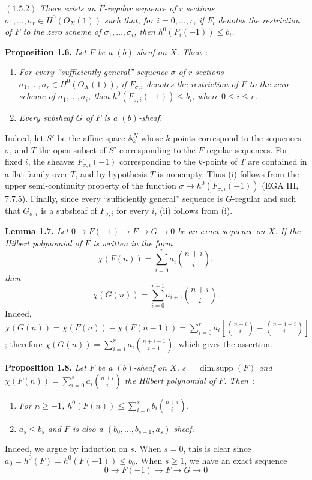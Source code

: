 \((1.5.2)\) \emph{There exists an \(F\)-regular sequence of \(r\) sections \(\sigma_1,\ldots,\sigma_r\in H^0({O}_X(1))\) such that, for \(i=0,\ldots,r\), if \(F_i\) denotes the restriction of \(F\) to the zero scheme of \(\sigma_1,\ldots,\sigma_i\), then \(h^0(F_i(-1))\le b_i\).}

\textbf{Proposition 1.6.} \emph{Let \(F\) be a \((b)\)-sheaf on \(X\). Then}~:
\begin{enumerate}[label=(\roman*)]
\item \emph{For every ``sufficiently general'' sequence \(\sigma\) of \(r\) sections \(\sigma_1,\ldots,\sigma_r\in H^0({O}_X(1))\), if \(F_{\sigma,i}\) denotes the restriction of \(F\) to the zero scheme of \(\sigma_1,\ldots,\sigma_i\), then \(h^0(F_{\sigma,i}(-1))\le b_i\), where \(0\le i\le r\).}
\item \emph{Every subsheaf \(G\) of \(F\) is a \((b)\)-sheaf.}
\end{enumerate}

%
Indeed, let \(S'\) be the affine space \(\mathbb A_k^N\) whose \(k\)-points correspond to the sequences \(\sigma\), and \(T\) the open subset of \(S'\) corresponding to the \(F\)-regular sequences. For fixed \(i\), the sheaves \(F_{\sigma,i}(-1)\) corresponding to the \(k\)-points of \(T\) are contained in a flat family over \(T\), and by hypothesis \(T\) is nonempty. Thus (i) follows from the upper semi-continuity property of the function $\sigma\longmapsto h^0(F_{\sigma,i}(-1))$ (EGA III, 7.7.5). Finally, since every ``sufficiently general'' sequence is \(G\)-regular and such that \(G_{\sigma,i}\) is a subsheaf of \(F_{\sigma,i}\) for every \(i\), (ii) follows from (i).

\textbf{Lemma 1.7.} \emph{Let \(0\to F(-1)\to F\to G\to0\) be an exact sequence on \(X\). If the Hilbert polynomial of \(F\) is written in the form}
\[
 \chi(F(n))=\sum_{i=0}^{r}a_i\binom{n+i}{i},
\]
\emph{then}
\[
 \chi(G(n))=\sum_{i=0}^{r-1}a_{i+1}\binom{n+i}{i}.
\]
Indeed, \(\chi(G(n))=\chi(F(n))-\chi(F(n-1))=\sum_{i=0}^{r}a_i\left[\binom{n+i}{i}-\binom{n-1+i}{i}\right]\); therefore \(\chi(G(n))=\sum_{i=1}^{r}a_i\binom{n+i-1}{i-1}\), which gives the assertion.

\textbf{Proposition 1.8.} \emph{Let \(F\) be a \((b)\)-sheaf on \(X\), \(s=\operatorname{dim{.}supp}(F)\) and \(\chi(F(n))=\sum_{i=0}^{s}a_i\binom{n+i}{i}\) the Hilbert polynomial of \(F\). Then}~:
\begin{enumerate}[label=(\roman*)]
\item \emph{For \(n\ge -1\), \(h^0(F(n))\le \sum_{i=0}^{s}b_i\binom{n+i}{i}\).}
\item \emph{\(a_s\le b_s\) and \(F\) is also a \((b_0,\ldots,b_{s-1},a_s)\)-sheaf.}
\end{enumerate}
Indeed, we argue by induction on \(s\). When \(s=0\), this is clear since \(a_0=h^0(F)=h^0(F(-1))\le b_0\). When \(s\ge1\), we have an exact sequence
\[
0\longrightarrow F(-1)\longrightarrow F\longrightarrow G\longrightarrow0
\]
